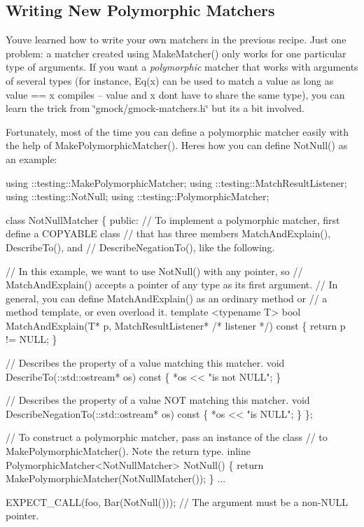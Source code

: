 \subsection*{Writing New Polymorphic Matchers}

You\textquotesingle{}ve learned how to write your own matchers in the previous recipe. Just one problem\+: a matcher created using {\ttfamily Make\+Matcher()} only works for one particular type of arguments. If you want a {\itshape polymorphic} matcher that works with arguments of several types (for instance, {\ttfamily Eq(x)} can be used to match a {\ttfamily value} as long as {\ttfamily value} == {\ttfamily x} compiles -- {\ttfamily value} and {\ttfamily x} don\textquotesingle{}t have to share the same type), you can learn the trick from {\ttfamily \char`\"{}gmock/gmock-\/matchers.\+h\char`\"{}} but it\textquotesingle{}s a bit involved.

Fortunately, most of the time you can define a polymorphic matcher easily with the help of {\ttfamily Make\+Polymorphic\+Matcher()}. Here\textquotesingle{}s how you can define {\ttfamily Not\+Null()} as an example\+:


\begin{DoxyCode}
using ::testing::MakePolymorphicMatcher;
using ::testing::MatchResultListener;
using ::testing::NotNull;
using ::testing::PolymorphicMatcher;

class NotNullMatcher \{
 public:
  // To implement a polymorphic matcher, first define a COPYABLE class
  // that has three members MatchAndExplain(), DescribeTo(), and
  // DescribeNegationTo(), like the following.

  // In this example, we want to use NotNull() with any pointer, so
  // MatchAndExplain() accepts a pointer of any type as its first argument.
  // In general, you can define MatchAndExplain() as an ordinary method or
  // a method template, or even overload it.
  template <typename T>
  bool MatchAndExplain(T* p,
                       MatchResultListener* /* listener */) const \{
    return p != NULL;
  \}

  // Describes the property of a value matching this matcher.
  void DescribeTo(::std::ostream* os) const \{ *os << "is not NULL"; \}

  // Describes the property of a value NOT matching this matcher.
  void DescribeNegationTo(::std::ostream* os) const \{ *os << "is NULL"; \}
\};

// To construct a polymorphic matcher, pass an instance of the class
// to MakePolymorphicMatcher().  Note the return type.
inline PolymorphicMatcher<NotNullMatcher> NotNull() \{
  return MakePolymorphicMatcher(NotNullMatcher());
\}
...

  EXPECT\_CALL(foo, Bar(NotNull()));  // The argument must be a non-NULL pointer.
\end{DoxyCode}


